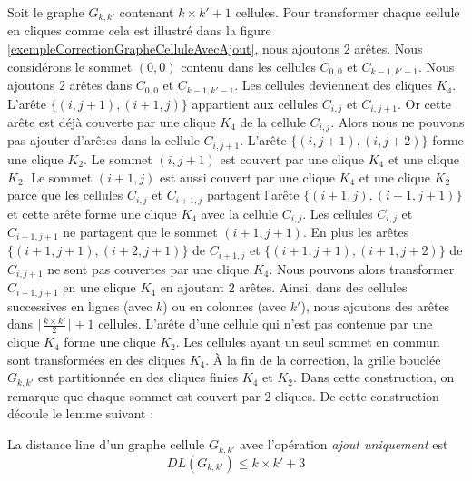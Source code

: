 Soit le graphe $G_{k,k'}$ contenant $k \times k' + 1$ cellules.
Pour transformer chaque cellule en cliques comme cela est illustr\'e dans la figure \ref{exempleCorrectionGrapheCelluleAvecAjout}, nous ajoutons $2$ ar\^etes.
Nous consid\'erons le sommet $(0,0)$ contenu dans les cellules $C_{0,0}$ et $C_{k-1,k'-1}$.
Nous ajoutons $2$ ar\^etes dans $C_{0,0}$ et $C_{k-1,k'-1}$. Les cellules deviennent des cliques $K_4$. 
\newline
L'ar\^ete $\{(i,j+1),(i+1,j)\}$ appartient aux cellules  $C_{i,j}$ et  $C_{i,j+1}$.
Or cette ar\^ete est d\'ej\`a couverte par une clique $K_4$ de la cellule $C_{i,j}$.
Alors nous ne pouvons pas ajouter d'ar\^etes dans la cellule $C_{i,j+1}$.
 L'ar\^ete $\{(i,j+1),(i,j+2)\}$ forme une clique $K_2$.
 Le sommet $(i,j+1)$ est couvert par une clique $K_4$ et une clique $K_2$. 
Le sommet $(i+1,j)$ est aussi couvert par une clique $K_4$ et une clique $K_2$ parce que les cellules $C_{i,j}$ et  $C_{i+1,j}$ partagent l'ar\^ete $\{(i+1,j),(i+1,j+1)\}$  et cette ar\^ete forme une clique $K_4$ avec la cellule $C_{i,j}$.
Les cellules $C_{i,j}$ et  $C_{i+1,j+1}$ ne partagent que le sommet  $(i+1,j+1)$. En plus les ar\^etes  $\{(i+1,j+1),(i+2,j+1)\}$ de  $C_{i+1,j}$ et  $\{(i+1,j+1),(i+1,j+2)\}$ de $C_{i,j+1}$ ne sont pas couvertes par une clique $K_4$. Nous pouvons alors transformer $C_{i+1,j+1}$ en une clique $K_4$  en ajoutant $2$ ar\^etes.
\newline
Ainsi, dans des cellules successives en lignes (avec $k$) ou en colonnes (avec $k'$), nous ajoutons des ar\^etes dans $\lceil \frac{k \times k'}{2} \rceil  + 1$ cellules. 
L'ar\^ete  d'une cellule qui n'est pas contenue par une clique $K_4$ forme une clique $K_2$.
Les cellules ayant un seul sommet en commun sont transform\'ees en des cliques $K_4$. 
\newline
\`A la fin  de la correction, la grille boucl\'ee $G_{k,k'}$ est partitionn\'ee en des cliques finies $K_4$ et $K_2$.
Dans cette construction, on remarque que chaque sommet est couvert par $2$ cliques. De cette construction d\'ecoule le lemme suivant :

\begin{lemma}
La distance line d'un graphe cellule $G_{k,k'}$ avec l'op\'eration  {\em ajout uniquement} est 
\begin{equation}
DL(G_{k,k'}) \le k \times k' +3 
\end{equation}
\end{lemma}

